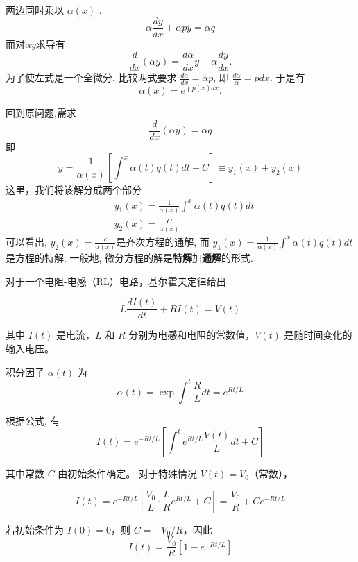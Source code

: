两边同时乘以 $\alpha(x)$ .
\begin{equation}
     \alpha \frac{d y}{d x}+\alpha p y=\alpha q 
\end{equation}
而对$\alpha y$求导有
\begin{equation}
    \frac{d}{d x}(\alpha y)=\frac{d \alpha}{d x} y+\alpha \frac{d y}{d x} .
\end{equation}
为了使左式是一个全微分, 比较两式要求
$\frac{d \alpha}{d x}=\alpha p $, 即 $\frac{d \alpha}{\alpha}=p d x $. 于是有
\begin{equation}
    \alpha(x)=e^{\int p(x) d x}.
\end{equation}

回到原问题,需求
$$\frac{d}{d x}(\alpha y)=\alpha q $$
即
\begin{equation}
    y=\frac{1}{\alpha(x)}\left[\int^x \alpha(t) q(t) dt+C\right] \equiv y_1(x)+y_2(x)
\end{equation}
这里，我们将该解分成两个部分
\begin{equation}
\begin{aligned}
& y_1(x)=\frac{1}{\alpha(x)} \int^x \alpha(t) q(t) d t \\
& y_2(x)=\frac{C}{\alpha(x)}
\end{aligned}
\end{equation}
可以看出, $y_2(x)=\frac{c}{\alpha(x)}$是齐次方程的通解,
而 $y_1(x)=\frac{1}{\alpha(x)} \int^x \alpha(t) q(t) d t$是方程的特解.
一般地, 微分方程的解是\textbf{特解}加\textbf{通解}的形式.



\begin{example}
    对于一个电阻-电感（RL）电路，基尔霍夫定律给出

$$
L \frac{d I(t)}{d t}+R I(t)=V(t)
$$

其中 $I(t)$ 是电流，$L$ 和 $R$ 分别为电感和电阻的常数值，$V(t)$ 是随时间变化的输入电压。
\end{example}

\begin{solution}
积分因子 $\alpha(t)$ 为
$$
\alpha(t)=\exp \int^t \frac{R}{L} d t=e^{R t / L}
$$

根据公式, 有
$$
I(t)=e^{-R t / L}\left[\int^t e^{R t / L} \frac{V(t)}{L} d t+C\right]
$$

其中常数 $C$ 由初始条件确定。
对于特殊情况 $V(t)=V_0$（常数），

$$
I(t)=e^{-R t / L}\left[\frac{V_0}{L} \cdot \frac{L}{R} e^{R t / L}+C\right]=\frac{V_0}{R}+C e^{-R t / L}
$$

若初始条件为 $I(0)=0$，则 $C=-V_0 / R$，因此
$$
I(t)=\frac{V_0}{R}\left[1-e^{-R t / L}\right]
$$
\end{solution}


